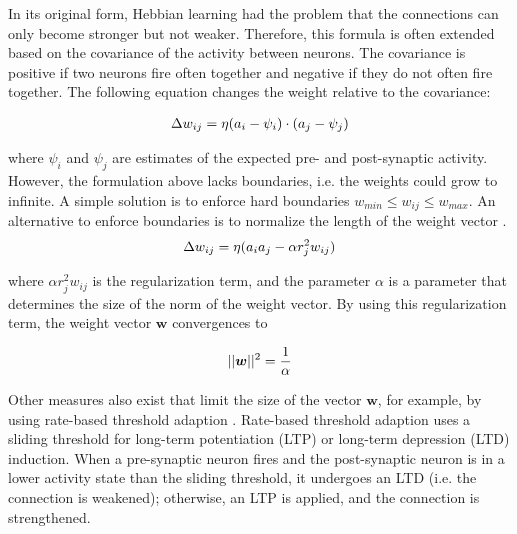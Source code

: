 In its original form, Hebbian learning had the problem that the connections can only become stronger but not weaker.
Therefore, this formula is often extended based on the covariance of the activity between neurons.
The covariance is positive if two neurons fire often together and negative if they do not often fire together.
The following equation changes the weight relative to the covariance:

\begin{align}\eqlbl{hebb_2}
	\Delta w_{ij} = \eta (a_i - \psi_i) \cdot (a_j - \psi_j)
\end{align}

where \(\psi_i\) and \(\psi_j\) are estimates of the expected pre- and post-synaptic activity.
However, the formulation above lacks boundaries, i.e. the weights could grow to infinite.
A simple solution is to enforce hard boundaries \(w_{min} \leq w_{ij} \leq w_{max}\).
An alternative to enforce boundaries is to normalize the length of the weight vector .
\begin{align}\eqlbl{hebb_3}
	\Delta w_{ij} = \eta (a_i a_j - \alpha r^2_j w_{ij})
\end{align}

where $\alpha r^2_j w_{ij}$ is the regularization term, and the parameter \(\alpha\) is a parameter that determines the size of the norm of the weight vector.
By using this regularization term, the weight vector $\boldsymbol{w}$ convergences to

\begin{align}\eqlbl{hebb_31}
	||\boldsymbol{w}||^2 = \frac{1}{\alpha}
\end{align}

Other measures also exist that limit the size of the vector $\boldsymbol{w}$, for example, by using rate-based threshold adaption . Rate-based threshold adaption uses a sliding threshold for long-term potentiation (LTP) or long-term depression (LTD) induction.
When a pre-synaptic neuron fires and the post-synaptic neuron is in a lower activity state than the sliding threshold, it undergoes an LTD (i.e. the connection is weakened); otherwise, an LTP is applied, and the connection is strengthened.   


